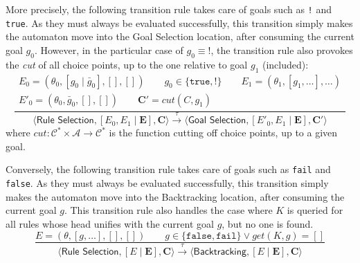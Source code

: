 \documentclass{article}
\newcommand{\stateStyle}[1]{\textsf{#1}}
\newcommand{\state}[1]{\stateStyle{#1}}
\newcommand{\stream}[1]{\bar{#1}}
\newcommand{\vect}[1]{\mathbf{#1}}
\newcommand{\notableset}[1]{\mathcal{#1}}
\newcommand{\f}[1]{\mathit{#1}}
\newcommand{\fx}[2]{\f{#1}(#2)}
\newcommand{\transition}[1]{\xrightarrow{\ #1\ }}
\begin{document}
More precisely, the following transition rule takes care of goals such as \texttt{!} and \texttt{true}.
%
As they must always be evaluated successfully, this transition simply makes the automaton move into the \state{Goal Selection} location, after consuming the current goal $g_0$.
%
However, in the particular case of $g_0 \equiv \mathtt{!}$, the transition rule also provokes the \emph{cut} of all choice points, up to the one relative to goal $g_1$ (included):
%
%
\[
    \frac{
        \begin{array}{c}
            E_0 = (\theta_0, [g_0 \mid \stream{g}_0], [], [])
            \qquad
            g_0 \in \{ \mathtt{true}, \mathtt{!} \}
            \qquad
            E_1 = (\theta_1, [g_1, \ldots], \ldots)
            \\
            E'_0 = (\theta_0, \stream{g}_0, [], [])
            \qquad
            \vect{C}' = \fx{cut}{C, g_1}
        \end{array}
    }{
        \langle \state{Rule Selection}, [E_0, E_1 \mid \vect{E}], \vect{C} \rangle
        \transition{\tau}
        \langle \state{Goal Selection}, [E'_0, E_1 \mid \vect{E}], \vect{C}' \rangle
    }
\]
%
where $\f{cut} : \notableset{C^*} \times \notableset{A} \rightarrow \notableset{C^*}$ is the function cutting off choice points, up to a given goal.

Conversely, the following transition rule takes care of goals such as \texttt{fail} and \texttt{false}.
%
As they must always be evaluated successfully, this transition simply makes the automaton move into the \state{Backtracking} location, after consuming the current goal $g$.
%
This transition rule also handles the case where $K$ is queried for all rules whose head unifies with the current goal $g$, but no one is found.
%
\[
    \frac{
        E = (\theta, [g, \ldots], [], [])
        \qquad
        g \in \{ \mathtt{false}, \mathtt{fail} \} \lor \fx{get}{K, g} = []
    }{
        \langle \state{Rule Selection}, [E \mid \vect{E}], \vect{C} \rangle
        \transition{\tau}
        \langle \state{Backtracking}, [E \mid \vect{E}], \vect{C} \rangle
    }
\]
\end{document}
